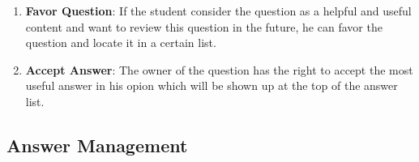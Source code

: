 \begin{enumerate}
\item
\textbf{Favor Question}: If the student consider the question as a helpful and useful content and want to review this question in the future, he can favor the question and locate it in a certain list.


\item
\textbf{Accept Answer}: The owner of the question has the right to accept the most useful answer in his opion which will be shown up at the top of the answer list.


\end{enumerate}

\subsection{Answer Management}

